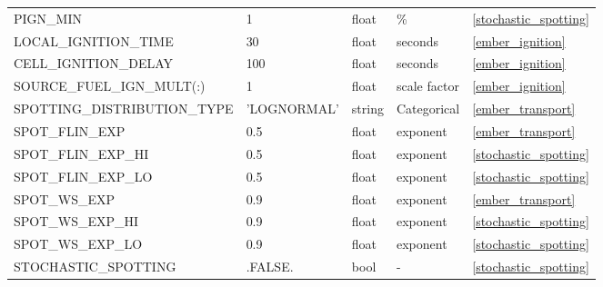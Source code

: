 \begin{landscape}
\begin{center}
\begin{longtable}{lllll}
PIGN\_MIN                                    & 1                          & float                  & \%                                 & \ref{stochastic_spotting}            \\
LOCAL\_IGNITION\_TIME                        & 30                         & float                  & seconds                            & \ref{ember_ignition}                 \\
CELL\_IGNITION\_DELAY                        & 100                        & float                  & seconds                            & \ref{ember_ignition}                 \\
SOURCE\_FUEL\_IGN\_MULT(:)                   & 1                          & float                  & scale factor                       & \ref{ember_ignition}                 \\
SPOTTING\_DISTRIBUTION\_TYPE                 & 'LOGNORMAL'                & string                 & Categorical                        & \ref{ember_transport}                \\
SPOT\_FLIN\_EXP                              & 0.5                        & float                  & exponent                           & \ref{ember_transport}                \\
SPOT\_FLIN\_EXP\_HI                          & 0.5                        & float                  & exponent                           & \ref{stochastic_spotting}            \\
SPOT\_FLIN\_EXP\_LO                          & 0.5                        & float                  & exponent                           & \ref{stochastic_spotting}            \\
SPOT\_WS\_EXP                                & 0.9                        & float                  & exponent                           & \ref{ember_transport}                \\
SPOT\_WS\_EXP\_HI                            & 0.9                        & float                  & exponent                           & \ref{stochastic_spotting}            \\
SPOT\_WS\_EXP\_LO                            & 0.9                        & float                  & exponent                           & \ref{stochastic_spotting}            \\
STOCHASTIC\_SPOTTING                         & .FALSE.                    & bool                   & -                                  & \ref{stochastic_spotting}            \\

\end{longtable}
\end{center}
\end{landscape}
